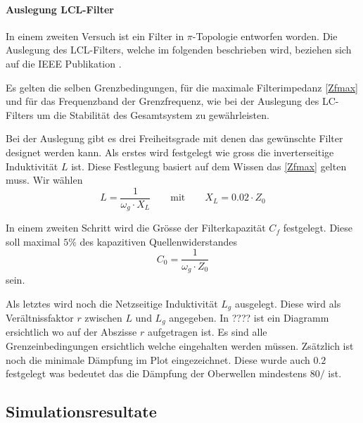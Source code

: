 \paragraph{Auslegung LCL-Filter }
In einem zweiten Versuch ist ein Filter in $\pi$-Topologie entworfen worden. 
Die Auslegung des LCL-Filters, welche im folgenden beschrieben wird, beziehen sich auf die IEEE Publikation \cite{desLCLFilter}.

Es gelten die selben Grenzbedingungen, für die maximale Filterimpedanz \ref{Zfmax} und für das Frequenzband der Grenzfrequenz, wie bei der Auslegung des LC-Filters um die Stabilität des Gesamtsystem zu gewährleisten.

Bei der Auslegung gibt es drei Freiheitsgrade mit denen das gewünschte Filter designet werden kann.
Als erstes wird festgelegt wie gross die inverterseitige Induktivität $L$ ist.
Diese Festlegung basiert auf dem Wissen das \ref{Zfmax} gelten muss.
Wir wählen 
\begin{equation}
L=\dfrac{1}{\omega_g\cdot X_L}\qquad \text{mit} \qquad   X_L=0.02\cdot Z_0
\end{equation}

In einem zweiten Schritt wird die Grösse der Filterkapazität $C_f$ festgelegt.
Diese soll maximal $5\%$ des kapazitiven Quellenwiderstandes 
\begin{equation}
C_0 = \dfrac{1}{\omega_g\cdot Z_0}
\end{equation}
sein.

Als letztes wird noch die Netzseitige Induktivität $L_g$ ausgelegt. 
Diese wird als Verältnissfaktor $r$ zwischen $L$ und $L_g$ 
angegeben.
In ???? ist ein Diagramm ersichtlich wo auf der Abszisse $r$ aufgetragen ist.
Es sind alle Grenzeinbedingungen ersichtlich welche eingehalten werden müssen.
Zsätzlich ist noch die minimale Dämpfung im Plot eingezeichnet. Diese wurde auch $0.2$ festgelegt was bedeutet das die Dämpfung der Oberwellen mindestens $80/$ ist.

\subsection{Simulationsresultate}
\label{SimRes}


